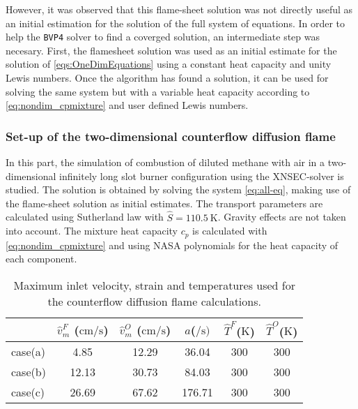 However, it was observed that this flame-sheet solution was not directly useful as an initial estimation for the solution of the full system of equations. In order to help  the \lstinline|BVP4| solver to find a coverged solution, an intermediate step was necesary. First, the flamesheet solution was used as an initial estimate for the solution of  \cref{eqs:OneDimEquations} using a constant heat capacity and unity Lewis numbers. Once the algorithm has found a solution, it can be used for solving the same system but with a variable heat capacity according to \cref{eq:nondim_cpmixture} and user defined Lewis numbers.

\subsubsection{Set-up of the two-dimensional counterflow diffusion flame}

In this part, the simulation of combustion of diluted methane with air in a two-dimensional infinitely long slot burner configuration using the XNSEC-solver is studied. The solution is obtained by solving the system \cref{eq:all-eq}, making use of the flame-sheet solution as initial estimates. The transport parameters are calculated using Sutherland law with $\hat{S} = \SI{110.5}{\kelvin}$. Gravity effects are not taken into account.  The mixture heat capacity $c_p$ is calculated with \cref{eq:nondim_cpmixture} and using NASA polynomials for the heat capacity of each component.
\begin{table}[b]
	\centering
	\begin{tabular}{lccccc}
		\hline
		& \multicolumn{1}{l}{$\hat v^F_m$ ($\si{\centi \meter \per \second}$)} & \multicolumn{1}{l}{$\hat v^O_m$ ($\si{\centi \meter \per \second}$)} & $a$($\si{\per\second})$ & \multicolumn{1}{l}{$\hat T^F$($\si{\kelvin}$)} & \multicolumn{1}{l}{$\hat T^O$($\si{\kelvin}$)} \\ \hline
		case(a) & 4.85                                                                 & 12.29                                                                & 36.04                    & 300                                            & 300                                           \\
		case(b) & 12.13                                                                & 30.73                                                                & 84.03                     & 300                                            & 300                                           \\
		case(c) & 26.69                                                                & 67.62                                                                & 176.71                    & 300                                            & 300                                           \\ \hline
	\end{tabular}
	\caption{Maximum inlet velocity, strain and temperatures used for the counterflow diffusion flame calculations.}
	\label{tab:cdf_velocities}
\end{table}

